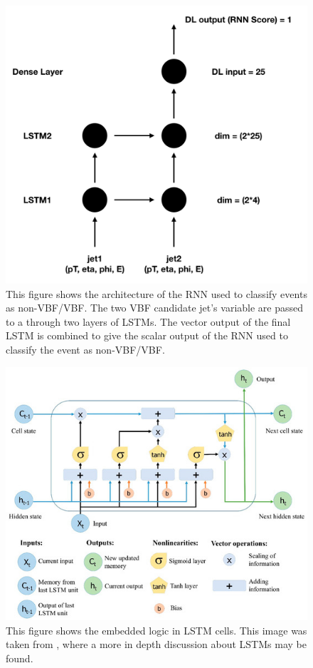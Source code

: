 \begin{figure}[h!]
  \centering
  \includegraphics[width=\hsize]{figures/Analysis/rnn_architecture.png}
  \caption{This figure shows the architecture of the RNN used to classify events as non-VBF/VBF. The two VBF candidate jet's variable are passed to a through two layers of LSTMs. The vector output of the final LSTM is combined to give the scalar output of the RNN used to classify the event as non-VBF/VBF. } 
  \label{fig:rnn_architecture}
\end{figure}
\FloatBarrier

\begin{figure}[h!]
  \centering
  \includegraphics[width=\hsize]{figures/Analysis/LSTM_structure.jpeg}
  \caption{This figure shows the embedded logic in LSTM cells. This image was taken from \cite{lstmstruct}, where a more in depth discussion about LSTMs may be found. }
  \label{fig:lstm_struct}
\end{figure}
\FloatBarrier


